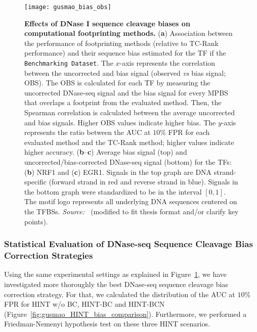 \begin{figure}[h!]
\centering
\texttt{[image: gusmao\_bias\_obs]}
\caption[Effects of DNase I sequence cleavage biases on computational footprinting methods]{\textbf{Effects of DNase I sequence cleavage biases on computational footprinting methods.} (\textbf{a}) Association between the performance of footprinting methods (relative to TC-Rank performance) and their sequence bias estimated for the TF if the {\tt Benchmarking Dataset}. The $x$-axis represents the correlation between the uncorrected and bias signal (observed \emph{vs} bias signal; OBS). The OBS is calculated for each TF by measuring the uncorrected DNase-seq signal and the bias signal for every MPBS that overlaps a footprint from the evaluated method. Then, the Spearman correlation is calculated between the average uncorrected and bias signals. Higher OBS values indicate higher bias. The $y$-axis represents the ratio between the AUC at $10\%$ FPR for each evaluated method and the TC-Rank method; higher values indicate higher accuracy. (\textbf{b}--\textbf{c}) Average bias signal (top) and uncorrected/bias-corrected DNase-seq signal (bottom) for the TFs: (\textbf{b}) NRF1 and (\textbf{c}) EGR1. Signals in the top graph are DNA strand-specific (forward strand in red and reverse strand in blue). Signals in the bottom graph were standardized to be in the interval $[0,1]$. The motif logo represents all underlying DNA sequences centered on the TFBSs. \emph{Source:~\cite{gusmao2016}} (modified to fit thesis format and/or clarify key points).}
\label{fig:gusmao_bias_obs}
\end{figure}

\subsubsection{Statistical Evaluation of DNase-seq Sequence Cleavage Bias Correction Strategies}

Using the same experimental settings as explained in Figure~\ref{fig:gusmao_bias_obs}, we have investigated more thoroughly the best DNase-seq sequence cleavage bias correction strategy. For that, we calculated the distribution of the AUC at $10\%$ FPR for HINT w/o BC, HINT-BC and HINT-BCN (Figure~\ref{fig:gusmao_HINT_bias_comparison}). Furthermore, we performed a Friedman-Nemenyi hypothesis test on these three HINT scenarios.

